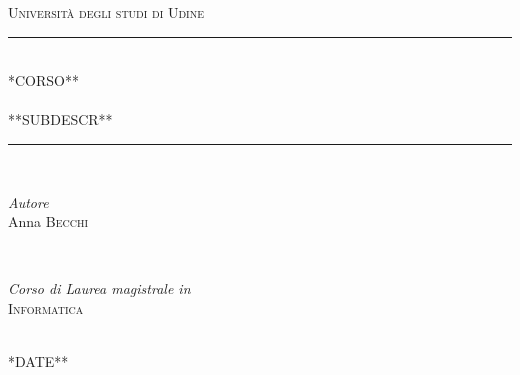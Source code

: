 \documentclass[a4paper 12pt]{article}
\begin{document}
\begin{titlepage}
  \newcommand{\Hule}{\rule{\linewidth}{0.5mm}}
  \center
  \textsc{\LARGE Università degli studi di Udine}\\[1.5cm]
  \Hule \\[0.1cm]
  \textsc{\Large **CORSO**\\~\\
    **SUBDESCR**}\\[0.5cm]
  \Hule \\[1cm]
  \begin{minipage}{0.48\textwidth}
    \begin{flushleft} \large
      \emph{Autore}\\
      Anna \textsc{Becchi}\\
    \end{flushleft}
  \end{minipage}
  ~
  \begin{minipage}{0.48\textwidth}
    \begin{flushright} \large
      \emph{Corso di Laurea magistrale in} \\
      \textsc{Informatica}
    \end{flushright}
  \end{minipage}\\[2cm]
  {\large **DATE**}\\[2cm]
  \vfill
\end{titlepage}
\newpage
\newpage
\end{document}
